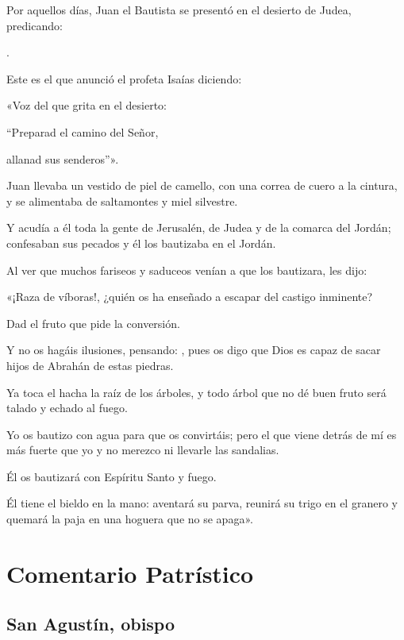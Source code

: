 
\begin{scripture}
	Por aquellos días, Juan el Bautista se presentó en el desierto de Judea,
	predicando:
	
	.
	
	Este es el que anunció el profeta Isaías diciendo:
	
	«Voz del que grita en el desierto: 
	
	``Preparad el camino del Señor, 
	
	allanad sus senderos''». 
	
	Juan llevaba un vestido de piel de camello, con una correa de cuero a la
	cintura, y se alimentaba de saltamontes y miel silvestre. 
	
	Y acudía a él toda la gente de Jerusalén, de Judea y de la comarca del
	Jordán; confesaban sus pecados y él los bautizaba en el Jordán. 
	
	Al ver que muchos fariseos y saduceos venían a que los bautizara, les
	dijo: 
	
	«¡Raza de víboras!, ¿quién os ha enseñado a escapar del castigo
	inminente? 
	
	Dad el fruto que pide la conversión. 
	
	Y no os hagáis ilusiones, pensando: ,
	pues os digo que Dios es capaz de sacar hijos de Abrahán de estas
	piedras. 
	
	Ya toca el hacha la raíz de los árboles, y todo árbol que no dé buen
	fruto será talado y echado al fuego. 
	
	Yo os bautizo con agua para que os convirtáis; pero el que viene detrás
	de mí es más fuerte que yo y no merezco ni llevarle las sandalias. 
	
	Él os bautizará con Espíritu Santo y fuego. 
	
	Él tiene el bieldo en la mano: aventará su parva, reunirá su trigo en el
	granero y quemará la paja en una hoguera que no se
	apaga».
\end{scripture}

\section{Comentario Patrístico} 

\subsection{San Agustín, obispo}

